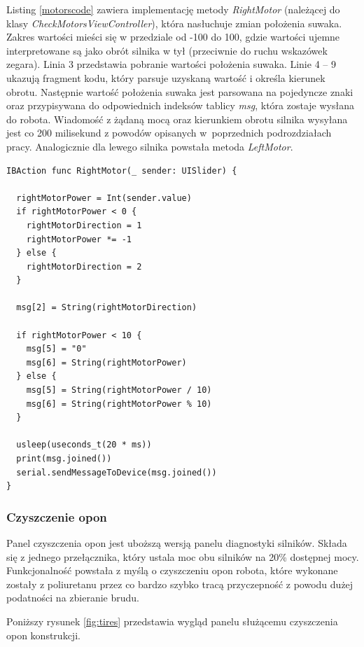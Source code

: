 Listing \ref{motorscode} zawiera implementację metody \textit{RightMotor} (należącej do klasy \textit{CheckMotorsViewController}), która nasłuchuje zmian położenia suwaka. Zakres wartości mieści się w przedziale od -100 do 100, gdzie wartości ujemne interpretowane są jako obrót silnika w tył (przeciwnie do ruchu wskazówek zegara). Linia 3 przedstawia pobranie wartości położenia suwaka. Linie 4 – 9 ukazują fragment kodu, który parsuje uzyskaną wartość i określa kierunek obrotu. Następnie wartość położenia suwaka jest parsowana na pojedyncze znaki oraz przypisywana do odpowiednich indeksów tablicy \textit{msg}, która zostaje wysłana do robota. Wiadomość z żądaną mocą oraz kierunkiem obrotu silnika wysyłana jest co 200 milisekund z powodów opisanych w~poprzednich podrozdziałach pracy. Analogicznie dla lewego silnika powstała metoda \textit{LeftMotor}.

\begin{minipage}{\textwidth}
	\begin{lstlisting}[label=motorscode,caption=Nasłuchiwanie zmiany położenia suwaka.]
IBAction func RightMotor(_ sender: UISlider) {
  
  rightMotorPower = Int(sender.value)
  if rightMotorPower < 0 {
    rightMotorDirection = 1
    rightMotorPower *= -1
  } else {
    rightMotorDirection = 2
  }
    
  msg[2] = String(rightMotorDirection)
    
  if rightMotorPower < 10 {
    msg[5] = "0"
    msg[6] = String(rightMotorPower)
  } else {
    msg[5] = String(rightMotorPower / 10)
    msg[6] = String(rightMotorPower % 10)
  }
    
  usleep(useconds_t(20 * ms))
  print(msg.joined())
  serial.sendMessageToDevice(msg.joined())
}
	\end{lstlisting}
\end{minipage}

\subsubsection{Czyszczenie opon}
Panel czyszczenia opon jest uboższą wersją panelu diagnostyki silników. Składa się z jednego przełącznika, który ustala moc obu silników na 20\% dostępnej mocy. Funkcjonalność powstała z myślą o czyszczeniu opon robota, które wykonane zostały z poliuretanu przez co bardzo szybko tracą przyczepność z powodu dużej podatności na zbieranie brudu.

\newpage

Poniższy rysunek \ref{fig:tires} przedstawia wygląd panelu służącemu czyszczenia opon konstrukcji.

